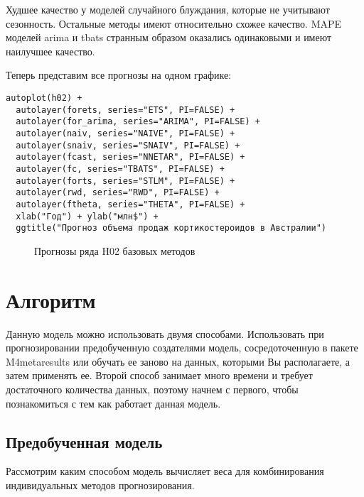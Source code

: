 \documentclass[a4paper,12pt]{article}
\theoremstyle{plain} %
\theoremstyle{definition} %
\theoremstyle{remark} %
\begin{document}
Худшее качество у моделей случайного блуждания, которые не учитывают сезонность.
Остальные методы  имеют относительно схожее качество.
MAPE моделей arima и tbats странным образом оказались одинаковыми и имеют наилучшее качество.

\vspace{2ex}

Теперь представим все прогнозы на одном графике:

\begin{verbatim}
autoplot(h02) +
  autolayer(forets, series="ETS", PI=FALSE) +
  autolayer(for_arima, series="ARIMA", PI=FALSE) +
  autolayer(naiv, series="NAIVE", PI=FALSE) +
  autolayer(snaiv, series="SNAIV", PI=FALSE) +
  autolayer(fcast, series="NNETAR", PI=FALSE) +
  autolayer(fc, series="TBATS", PI=FALSE) +
  autolayer(forts, series="STLM", PI=FALSE) +
  autolayer(rwd, series="RWD", PI=FALSE) +
  autolayer(ftheta, series="THETA", PI=FALSE) +
  xlab("Год") + ylab("млн$") +
  ggtitle("Прогноз объема продаж кортикостероидов в Австралии")
\end{verbatim}

\begin{figure}[H]
  \noindent{}
  \caption{Прогнозы ряда H02 базовых методов}
\end{figure}



\section{Алгоритм}

Данную модель можно использовать двумя способами.
Использовать при прогнозировании предобученную создателями модель, сосредоточенную в пакете M4metaresults или обучать ее заново на данных, которыми Вы располагаете, а затем применять ее.
Второй способ занимает много времени и требует достаточного количества данных, поэтому начнем с первого, чтобы познакомиться с тем как работает данная модель.


\subsection{Предобученная модель}

Рассмотрим каким способом модель вычисляет веса для комбинирования индивидуальных методов прогнозирования.
\vspace{2ex}
\end{document}
